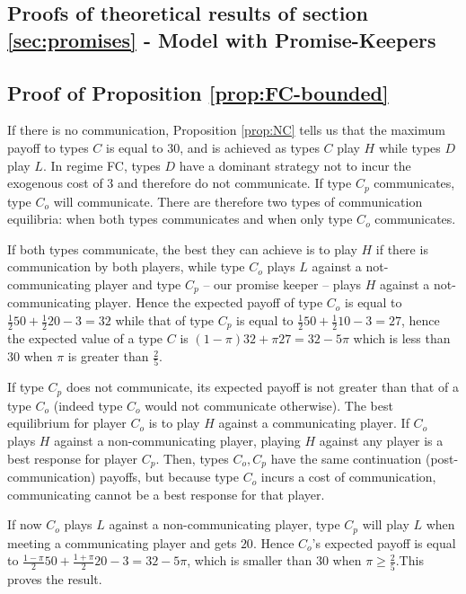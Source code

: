 \documentclass[12pt]{article}
\theoremstyle{break}
\begin{document}
%   
%    
\subsection{Proofs of theoretical results of section \ref{sec:promises}  - Model with Promise-Keepers}

\subsection*{Proof of Proposition \ref{prop:FC-bounded}}

	If there is no communication, Proposition \ref{prop:NC} tells us that the maximum payoff to types $C$ is equal to $30$, and is achieved as types $C$ play $H$ while types $D$ play $L$. In regime FC, types $D$ have a dominant strategy not to incur the exogenous cost of $3$ and therefore do not communicate. If type $C_p$ communicates, type $C_o$ will communicate. There are therefore two types of communication equilibria: when both types communicates and when only type $C_o$ communicates. 
	
	If both types communicate, the best they can achieve is to play $H$ if there is communication by both players, while type $C_o$ plays $L$ against a not-communicating player and type $C_p$ -- our promise keeper -- plays $H$ against a not-communicating player. Hence the expected payoff of type $C_o$ is equal to $\frac{1}{2}50+\frac{1}{2}20-3=32$ while that of type $C_p$ is equal to $\frac{1}{2}50+\frac{1}{2}10-3=27$, hence the expected value of a type $C$ is $(1-\pi)32+\pi 27=32-5\pi$ which is less than $30$ when $\pi$ is greater than $\frac{2}{5}$. 

	If type $C_p$ does not communicate, its expected payoff is not greater than that of a type $C_o$ (indeed type $C_o$ would not communicate otherwise). The best equilibrium for player $C_o$ is to play $H$ against a communicating player. If $C_o$ plays $H$ against a non-communicating player, playing $H$ against any player is a best response for player $C_p$. Then, types $C_o,C_p$ have the same continuation (post-communication) payoffs, but because type $C_o$ incurs a cost of communication, communicating cannot be a best response for that player. 
	
	If now $C_o$ plays $L$ against a non-communicating player, type $C_p$ will play $L$ when meeting a communicating player and gets $20$.  Hence $C_o$'s expected payoff is equal to $\frac{1-\pi}{2}50+\frac{1+\pi}{2}20-3=32-5\pi$, which is smaller than $30$ when $\pi\geq \frac{2}{5}$.This proves the result.
\end{document}
